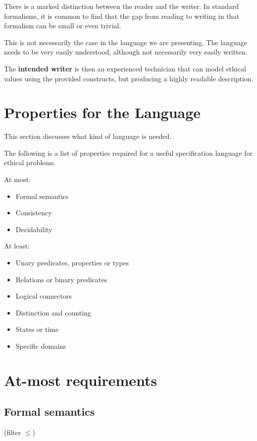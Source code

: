 There is a marked distinction between the reader and the writer.
In standard formalisms, it is common to find that the gap from reading to writing in that formalism can be small or even trivial.

This is not necessarily the case in the language we are presenting.
The language needs to be very easily understood, although not necessarily very easily written.

The \textbf{intended writer} is then an experienced technician that can model ethical values using the provided constructs, but producing a highly readable description.


\section{Properties for the Language}

This section discusses what kind of language is needed.

The following is a list of properties required for a useful specification language for ethical problems.

At most:
\begin{itemize}
    \item Formal semantics
    \item Consistency
    \item Decidability
\end{itemize}

At least:
\begin{itemize}
    \item Unary predicates, properties or types
    \item Relations or binary predicates
    \item Logical connectors
    \item Distinction and counting
    \item States or time
    \item Specific domains
\end{itemize}


\section{At-most requirements}

\subsection{Formal semantics}

(filter $\leq $)

